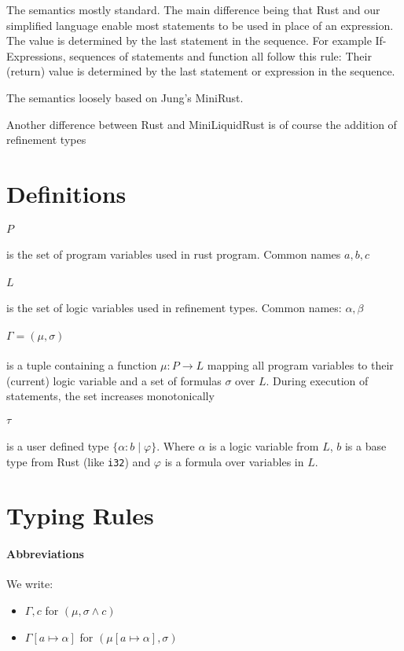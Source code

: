 \documentclass{article}
\begin{document}
The semantics mostly standard. The main difference being that Rust and our simplified language enable most statements to be used in place of an expression. The value is determined by the last statement in the sequence. For example If-Expressions, sequences of statements and function all follow this rule: Their (return) value is determined by the last statement or expression in the sequence.

The semantics loosely based on Jung's MiniRust.

Another difference between Rust and MiniLiquidRust is of course the addition of refinement types

\section{Definitions}

\paragraph*{$P$} is the set of program variables used in rust program. Common names $a, b, c$
\paragraph*{$L$} is the set of logic variables used in refinement types. Common names: $\alpha, \beta$

\paragraph*{$\Gamma = (\mu, \sigma)$} is a tuple containing a function $\mu: P \to L$ mapping all program variables to their (current) logic variable and a set of formulas $\sigma$ over $L$. During execution of statements, the set increases monotonically

\paragraph*{$\tau$} is a user defined type $\{ \alpha : b \mid \varphi\}$. Where $\alpha$ is a logic variable from $L$, $b$ is a base type from Rust (like \texttt{i32}) and $\varphi$ is a formula over variables in $L$.

\section{Typing Rules}

\paragraph*{Abbreviations}
We write:
\begin{itemize}
  \item  $\Gamma, c$ for $(\mu, \sigma \wedge c)$
  \item $\Gamma[a \mapsto \alpha]$ for $(\mu[a \mapsto \alpha], \sigma)$
\end{itemize}
\end{document}
